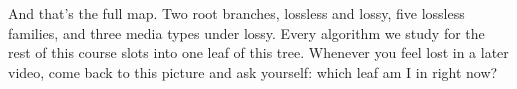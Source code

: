 \documentclass[11pt]{article}
\begin{document}
And that's the full map. Two root branches, lossless and lossy, five
lossless families, and three media types under lossy. Every algorithm we
study for the rest of this course slots into one leaf of this tree. Whenever
you feel lost in a later video, come back to this picture and ask yourself:
which leaf am I in right now?
\end{document}
